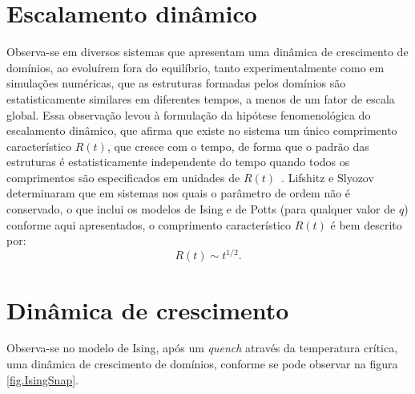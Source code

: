 \section{Escalamento dinâmico}

Observa-se em diversos sistemas que apresentam uma dinâmica de crescimento de domínios, ao evoluírem fora do equilíbrio, tanto experimentalmente como em simulações numéricas, que as estruturas formadas pelos domínios são estatisticamente similares em diferentes tempos, a menos de um fator de escala global. Essa observação levou à formulação da hipótese fenomenológica do escalamento dinâmico, que afirma que existe no sistema um único comprimento característico $R(t)$, que cresce com o tempo, de forma que o padrão das estruturas é estatisticamente independente do tempo quando todos os comprimentos são especificados em unidades de $R(t)$~\cite{ReviewBray}. Lifshitz e Slyozov~\cite{Lifshitz1961,Lifshitz1962} determinaram que em sistemas nos quais o parâmetro de ordem não é conservado, o que inclui os modelos de Ising e de Potts (para qualquer valor de $q$) conforme aqui apresentados, o comprimento característico $R(t)$ é bem descrito por:
\begin{equation}
 R(t) \sim t^{1/2}. 
\end{equation}


\section{Dinâmica de crescimento}

Observa-se no modelo de Ising, após um \textit{quench} através da temperatura crítica, uma dinâmica de crescimento de domínios, conforme se pode observar na figura \ref{fig.IsingSnap}.

